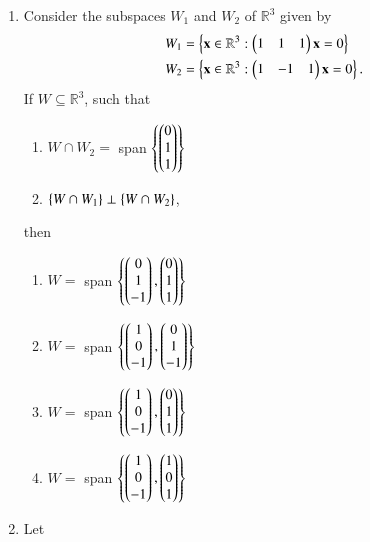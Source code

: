 \renewcommand{\theequation}{\theenumi}
\renewcommand{\thefigure}{\theenumi}
\begin{enumerate}[label=\thesection.\arabic*.,ref=\thesection.\theenumi]

\item Consider the subspaces $W_1$ and $W_2$ of $\mathbb{R}^3$ given by
\begin{align}
W_1 &= \left\{\mathbf{x} \in \mathbb{R}^3: \begin{pmatrix}1 & 1 & 1\end{pmatrix}\mathbf{x} = 0\right\}
\label{eq:solutions/2018/dec/27/eq:1}
\\
W_2 &= \left\{\mathbf{x} \in \mathbb{R}^3: \begin{pmatrix}1 & -1 & 1\end{pmatrix}\mathbf{x} = 0\right\}.
\label{eq:solutions/2018/dec/27/eq:2}
\end{align}
If $W \subseteq \mathbb{R}^3$, such that 
\begin{enumerate}
\item $W \cap W_2 =$ span $\left\{\begin{pmatrix}0\\1\\1\end{pmatrix}\right\}$
\label{eq:solutions/2018/dec/27/eq:3}
\item $\left\{W \cap W_1\right\} \perp \left\{W \cap W_2\right\}$, 
\label{eq:solutions/2018/dec/27/eq:4}
\end{enumerate}
then 
\begin{enumerate}
\item $W =$ span $\left\{\begin{pmatrix}0\\1\\-1\end{pmatrix},\begin{pmatrix}0\\1\\1\end{pmatrix}\right\}$
\item $W =$ span $\left\{\begin{pmatrix}1\\0\\-1\end{pmatrix},\begin{pmatrix}0\\1\\-1\end{pmatrix}\right\}$
\item $W =$ span $\left\{\begin{pmatrix}1\\0\\-1\end{pmatrix},\begin{pmatrix}0\\1\\1\end{pmatrix}\right\}$
\item $W =$ span $\left\{\begin{pmatrix}1\\0\\-1\end{pmatrix},\begin{pmatrix}1\\0\\1\end{pmatrix}\right\}$
\end{enumerate}
\solution

%
\item Let
\begin{align}

\end{align}
\end{enumerate}
